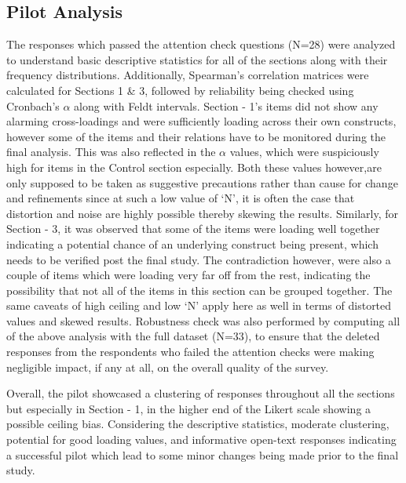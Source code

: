 \subsection{Pilot Analysis} \label{subsec: pilot analysis}
The responses which passed the attention check questions (N=28) were analyzed to understand basic descriptive statistics for all of the sections along with their frequency distributions. Additionally, Spearman's correlation matrices were calculated for Sections 1 \& 3, followed by reliability being checked using Cronbach's $\alpha$ along with Feldt intervals. Section - 1's items did not show any alarming cross-loadings and were sufficiently loading across their own constructs, however some of the items and their relations have to be monitored during the final analysis. This was also reflected in the $\alpha$ values, which were suspiciously high for items in the Control section especially. Both these values however,are only supposed to be taken as suggestive precautions rather than cause for change and refinements since at such a low value of `N', it is often the case that distortion and noise are highly possible thereby skewing the results. Similarly, for Section - 3, it was observed that some of the items were loading well together indicating a potential chance of an underlying construct being present, which needs to be verified post the final study. The contradiction however, were also a couple of items which were loading very far off from the rest, indicating the possibility that not all of the items in this section can be grouped together. The same caveats of high ceiling and low `N' apply here as well in terms of distorted values and skewed results. Robustness check was also performed by computing all of the above analysis with the full dataset (N=33), to ensure that the deleted responses from the respondents who failed the attention checks were making negligible impact, if any at all, on the overall quality of the survey. 

Overall, the pilot showcased a clustering of responses throughout all the sections but especially in Section - 1, in the higher end of the Likert scale showing a possible ceiling bias. Considering the descriptive statistics, moderate clustering, potential for good loading values, and informative open-text responses indicating a successful pilot which lead to some minor changes being made prior to the final study.

